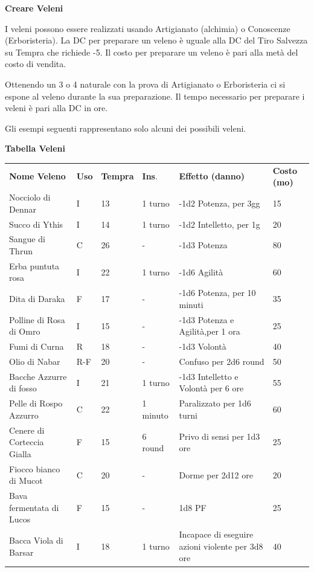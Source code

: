 \documentclass[a4paper,11pt,twoside,openany]{book}
\begin{document}
{\textbf{Creare Veleni}

I veleni possono essere realizzati usando Artigianato (alchimia) o Conoscenze (Erboristeria). La DC per preparare un veleno è uguale alla DC del Tiro Salvezza su Tempra che richiede -5. Il costo per preparare un veleno è pari alla metà del costo di vendita.

Ottenendo un 3 o 4 naturale con la prova di Artigianato o Erboristeria ci si espone al veleno durante la sua preparazione. Il tempo necessario per preparare i veleni è pari alla DC in ore. 

Gli esempi seguenti rappresentano solo alcuni dei possibili veleni.
\bigskip

\textbf{Tabella Veleni}

\medskip

\begin{tabular}{L{3.7cm} k{1cm} k{1.5cm} k{1.3cm} k{5.5cm} k{1.5cm}}
\toprule
\textbf{Nome Veleno} & \textbf{Uso} & \textbf{Tempra} & \textbf{Ins}. & \textbf{Effetto (danno)} & \textbf{Costo (mo)}\tabularnewline
Nocciolo di Dennar  & I & 13 & 1 turno & -1d2 Potenza, per 3gg & 15\tabularnewline
Succo di Ythis & I & 14 & 1 turno & -1d2 Intelletto, per 1g & 20\tabularnewline
Sangue di Thrun  & C & 26 & - & -1d3 Potenza & 80\tabularnewline
Erba puntuta rosa  & I & 22 & 1 turno & -1d6 Agilità & 60\tabularnewline
Dita di Daraka & F & 17 & - & -1d6 Potenza, per 10 minuti & 35\tabularnewline
Polline di Rosa di Omro & I & 15 & - & -1d3 Potenza e Agilità,per 1 ora & 25\tabularnewline
Fumi di Curna& R & 18 & - & -1d3 Volontà & 40\tabularnewline
Olio di Nabar  & R-F & 20 & - & Confuso per 2d6 round & 50\tabularnewline
Bacche Azzurre di fosso  & I & 21 & 1 turno & -1d3 Intelletto e Volontà per 6 ore & 55\tabularnewline
Pelle di Rospo Azzurro  & C & 22 & 1 minuto & Paralizzato per 1d6 turni & 60\tabularnewline
Cenere di Corteccia Gialla  & F & 15 & 6 round & Privo di sensi per 1d3 ore & 25\tabularnewline
Fiocco bianco di Mucot & C & 20 & - & Dorme per 2d12 ore & 20\tabularnewline
Bava fermentata di Lucos  & F & 15 & - & 1d8 PF & 25\tabularnewline
Bacca Viola di Barsar & I & 18 & 1 turno & Incapace di eseguire azioni violente per 3d8 ore & 40\\

\end{tabular}}
\end{document}
